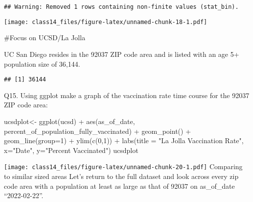 \documentclass[
]{article}
\newenvironment{Shaded}{\begin{snugshade}}{\end{snugshade}}
\newcommand{\AttributeTok}[1]{\textcolor[rgb]{0.77,0.63,0.00}{#1}}
\newcommand{\DecValTok}[1]{\textcolor[rgb]{0.00,0.00,0.81}{#1}}
\newcommand{\FunctionTok}[1]{\textcolor[rgb]{0.00,0.00,0.00}{#1}}
\newcommand{\NormalTok}[1]{#1}
\newcommand{\OtherTok}[1]{\textcolor[rgb]{0.56,0.35,0.01}{#1}}
\newcommand{\SpecialCharTok}[1]{\textcolor[rgb]{0.00,0.00,0.00}{#1}}
\newcommand{\StringTok}[1]{\textcolor[rgb]{0.31,0.60,0.02}{#1}}
\begin{document}
\begin{verbatim}
## Warning: Removed 1 rows containing non-finite values (stat_bin).
\end{verbatim}

\texttt{[image: class14\_files/figure-latex/unnamed-chunk-18-1.pdf]}

\#Focus on UCSD/La Jolla

UC San Diego resides in the 92037 ZIP code area and is listed with an
age 5+ population size of 36,144.

\begin{Shaded}
\end{Shaded}

\begin{verbatim}
## [1] 36144
\end{verbatim}

Q15. Using ggplot make a graph of the vaccination rate time course for
the 92037 ZIP code area:

\begin{Shaded}
\begin{Highlighting}[]
\NormalTok{ucsdplot}\OtherTok{\textless{}{-}} \FunctionTok{ggplot}\NormalTok{(ucsd) }\SpecialCharTok{+}
  \FunctionTok{aes}\NormalTok{(as\_of\_date,}
\NormalTok{      percent\_of\_population\_fully\_vaccinated) }\SpecialCharTok{+}
  \FunctionTok{geom\_point}\NormalTok{() }\SpecialCharTok{+}
  \FunctionTok{geom\_line}\NormalTok{(}\AttributeTok{group=}\DecValTok{1}\NormalTok{) }\SpecialCharTok{+}
  \FunctionTok{ylim}\NormalTok{(}\FunctionTok{c}\NormalTok{(}\DecValTok{0}\NormalTok{,}\DecValTok{1}\NormalTok{)) }\SpecialCharTok{+}
  \FunctionTok{labs}\NormalTok{(}\AttributeTok{title =} \StringTok{"La Jolla Vaccination Rate"}\NormalTok{, }\AttributeTok{x=}\StringTok{"Date"}\NormalTok{, }\AttributeTok{y=}\StringTok{"Percent Vaccinated"}\NormalTok{)}
\NormalTok{ucsdplot}
\end{Highlighting}
\end{Shaded}

\texttt{[image: class14\_files/figure-latex/unnamed-chunk-20-1.pdf]}
Comparing to similar sized areas Let's return to the full dataset and
look across every zip code area with a population at least as large as
that of 92037 on as\_of\_date ``2022-02-22''.
\end{document}
